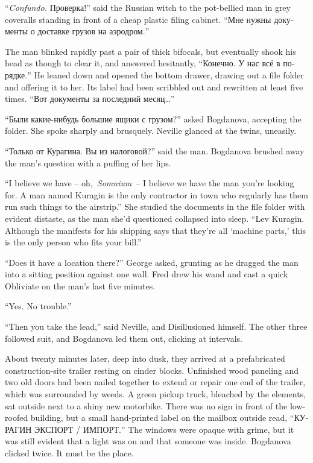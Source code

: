 ``\emph{Confundo.} \foreignlanguage{russian}{Проверка!}'' said the
Russian witch to the pot-bellied man in grey coveralls standing in front
of a cheap plastic filing cabinet. ``\foreignlanguage{russian}{Мне нужны
документы о доставке грузов на аэродром.}''

The man blinked rapidly past a pair of thick bifocals, but eventually
shook his head as though to clear it, and answered hesitantly,
``\foreignlanguage{russian}{Конечно. У нас всё в порядке.}'' He leaned
down and opened the bottom drawer, drawing out a file folder and
offering it to her. Its label had been scribbled out and rewritten at
least five times. ``\foreignlanguage{russian}{Вот документы за последний
месяц\ldots{}}''

``\foreignlanguage{russian}{Были какие-нибудь большие ящики с грузом?}''
asked Bogdanova, accepting the folder. She spoke sharply and brusquely.
Neville glanced at the twins, uneasily.

``\foreignlanguage{russian}{Только от Курагина. Вы из налоговой?}'' said
the man. Bogdanova brushed away the man's question with a puffing of her
lips.

``I believe we have -- oh,~\emph{Somnium}~-- I believe we have the man
you're looking for. A man named Kuragin is the only contractor in town
who regularly has them run such things to the airstrip.'' She studied
the documents in the file folder with evident distaste, as the man she'd
questioned collapsed into sleep. ``Lev Kuragin. Although the manifests
for his shipping says that they're all `machine parts,' this is the only
person who fits your bill.''

``Does it have a location there?'' George asked, grunting as he dragged
the man into a sitting position against one wall. Fred drew his wand and
cast a quick Obliviate on the man's last five minutes.

``Yes. No trouble.''

``Then you take the lead,'' said Neville, and Disillusioned himself. The
other three followed suit, and Bogdanova led them out, clicking at
intervals.

\mybreak

About twenty minutes later, deep into dusk, they arrived at a
prefabricated construction-site trailer resting on cinder blocks.
Unfinished wood paneling and two old doors had been nailed together to
extend or repair one end of the trailer, which was surrounded by weeds.
A green pickup truck, bleached by the elements, sat outside next to a
shiny new motorbike. There was no sign in front of the low-roofed
building, but a small hand-printed label on the mailbox outside read,
``\foreignlanguage{russian}{КУРАГИН ЭКСПОРТ / ИМПОРТ.}'' The windows
were opaque with grime, but it was still evident that a light was on and
that someone was inside. Bogdanova clicked twice. It must be the place.

